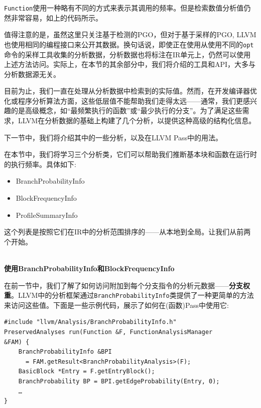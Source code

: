 \texttt{Function}使用一种略有不同的方式来表示其调用的频率。但是检索数值分析值仍然非常容易，如上的代码所示。

值得注意的是，虽然这里只关注基于检测的PGO，但对于基于采样的PGO, LLVM也使用相同的编程接口来公开其数据。换句话说，即使正在使用从使用不同的\texttt{opt}命令的采样工具收集的分析数据，分析数据也将标注在IR单元上，仍然可以使用上述方法访问。实际上，在本节的其余部分中，我们将介绍的工具和API，大多与分析数据源无关。

目前为止，我们一直在处理从分析数据中检索到的实际值。然而，在开发编译器优化或程序分析算法方面，这些低层值不能帮助我们走得太远——通常，我们更感兴趣的是高级概念，如“最频繁执行的函数”或“最少执行的分支”。为了满足这些需求，LLVM在分析数据的基础上构建了几个分析，以提供这种高级的结构化信息。

下一节中，我们将介绍其中的一些分析，以及在LLVM Pass中的用法。


在本节中，我们将学习三个分析类，它们可以帮助我们推断基本块和函数在运行时的执行频率。具体如下:

\begin{itemize}
\ttfamily
\item BranchProbabilityInfo
\item BlockFrequencyInfo
\item ProfileSummaryInfo
\end{itemize}

这个列表是按照它们在IR中的分析范围排序的——从本地到全局。让我们从前两个开始。

\hspace*{\fill} \\ %
\noindent
\textbf{使用BranchProbabilityInfo和BlockFrequencyInfo}

在前一节中，我们了解了如何访问附加到每个分支指令的分析元数据——\textbf{分支权重}。LLVM中的分析框架通过\texttt{BranchProbabilityInfo}类提供了一种更简单的方法来访问这些值。下面是一些示例代码，展示了如何在(函数)Pass中使用它:

\begin{lstlisting}[style=styleCXX]
#include "llvm/Analysis/BranchProbabilityInfo.h"
PreservedAnalyses run(Function &F, FunctionAnalysisManager
&FAM) {
	BranchProbabilityInfo &BPI
	  = FAM.getResult<BranchProbabilityAnalysis>(F);
	BasicBlock *Entry = F.getEntryBlock();
	BranchProbability BP = BPI.getEdgeProbability(Entry, 0);
	…
}
\end{lstlisting}

